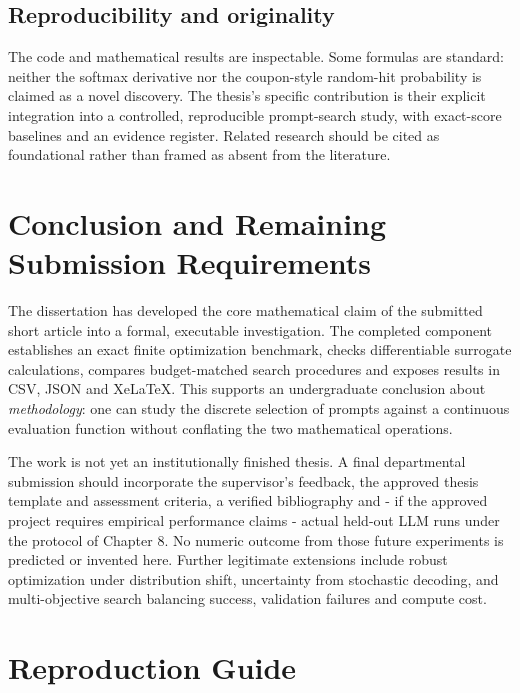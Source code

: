 \documentclass[12pt,a4paper,oneside]{report}
\begin{document}
\section{Reproducibility and originality}
The code and mathematical results are inspectable. Some formulas are standard: neither the softmax derivative nor the coupon-style random-hit probability is claimed as a novel discovery. The thesis's specific contribution is their explicit integration into a controlled, reproducible prompt-search study, with exact-score baselines and an evidence register. Related research should be cited as foundational rather than framed as absent from the literature.

\chapter{Conclusion and Remaining Submission Requirements}
The dissertation has developed the core mathematical claim of the submitted short article into a formal, executable investigation. The completed component establishes an exact finite optimization benchmark, checks differentiable surrogate calculations, compares budget-matched search procedures and exposes results in CSV, JSON and XeLaTeX. This supports an undergraduate conclusion about \emph{methodology}: one can study the discrete selection of prompts against a continuous evaluation function without conflating the two mathematical operations.

The work is not yet an institutionally finished thesis. A final departmental submission should incorporate the supervisor's feedback, the approved thesis template and assessment criteria, a verified bibliography and - if the approved project requires empirical performance claims - actual held-out LLM runs under the protocol of Chapter 8. No numeric outcome from those future experiments is predicted or invented here. Further legitimate extensions include robust optimization under distribution shift, uncertainty from stochastic decoding, and multi-objective search balancing success, validation failures and compute cost.

\appendix
\chapter{Reproduction Guide}
\end{document}
